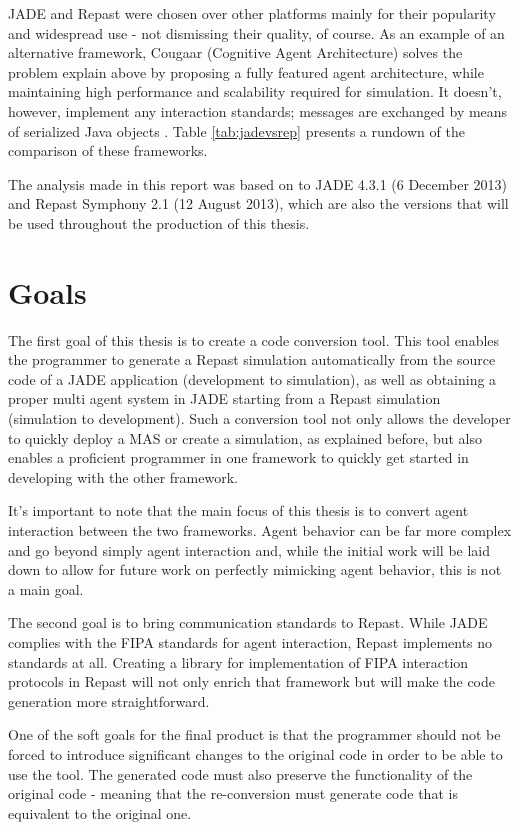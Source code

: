 JADE and Repast were chosen over other platforms mainly for their popularity and widespread use - not dismissing their quality, of course. As an example of an alternative framework, Cougaar (Cognitive Agent Architecture) solves the problem explain above by proposing a fully featured agent architecture, while maintaining high performance and scalability required for simulation. It doesn't, however, implement any interaction standards; messages are exchanged by means of serialized Java objects \cite{helsinger2004cougaar}. Table \ref{tab:jadevsrep} presents a rundown of the comparison of these frameworks.

The analysis made in this report was based on to JADE 4.3.1 (6 December 2013) and Repast Symphony 2.1 (12 August 2013), which are also the versions that will be used throughout the production of this thesis.


\section{Goals}
The first goal of this thesis is to create a code conversion tool. This tool enables the programmer to generate a Repast simulation automatically from the source code of a JADE application (development to simulation), as well as obtaining a proper multi agent system in JADE starting from a Repast simulation (simulation to development). Such a conversion tool not only allows the developer to quickly deploy a MAS or create a simulation, as explained before, but also enables a proficient programmer in one framework to quickly get started in developing with the other framework.

It's important to note that the main focus of this thesis is to convert agent interaction between the two frameworks. Agent behavior can be far more complex and go beyond simply agent interaction and, while the initial work will be laid down to allow for future work on perfectly mimicking agent behavior, this is not a main goal.

The second goal is to bring communication standards to Repast. While JADE complies with the FIPA standards for agent interaction, Repast implements no standards at all. Creating a library for implementation of FIPA interaction protocols in Repast will not only enrich that framework but will make the code generation more straightforward.

One of the soft goals for the final product is that the programmer should not be forced to introduce significant changes to the original code in order to be able to use the tool. The generated code must also preserve the functionality of the original code - meaning that the re-conversion must generate code that is equivalent to the original one.
 

